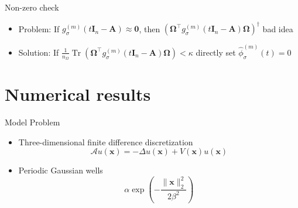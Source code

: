 \documentclass[aspectratio=169, leqno, 12pt]{beamer}
\newcommand{\mtx}[1]{\boldsymbol{#1}}
\newcommand{\vct}[1]{\boldsymbol{#1}}
\DeclareMathOperator{\Tr}{Tr}
\begin{document}
\begin{frame}{Non-zero check}
    \begin{itemize}
        \item Problem: If $g_{\sigma}^{(m)}(t\mtx{I}_n - \mtx{A}) \approx \mtx{0}$, then $(\mtx{\Omega}^{\top} g_{\sigma}^{(m)}(t\mtx{I}_n - \mtx{A}) \mtx{\Omega})^{\dagger}$ bad idea
        \item Solution: If $\frac{1}{n_{\Omega}} \Tr(\mtx{\Omega}^{\top} g_{\sigma}^{(m)}(t\mtx{I}_n - \mtx{A}) \mtx{\Omega}) < \kappa$ directly set $\widehat{\phi}_{\sigma}^{(m)}(t) = 0$
    \end{itemize}
    \centering
    \scalebox{0.8}{}
\end{frame}


\section{Numerical results}

\begin{frame}{Model Problem}
    \begin{itemize}
        \item Three-dimensional finite difference discretization \cite{lin2017randomized}
        \begin{equation}
            \mathcal{A} u(\vct{x}) = - \Delta u(\vct{x}) + V(\vct{x}) u(\vct{x})
        \end{equation}
        \item Periodic Gaussian wells
        \begin{equation}
            \alpha \exp(-\frac{\lVert \vct{x} \rVert _2^2}{ 2 \beta^2 })
        \end{equation}
    \end{itemize}
    \scalebox{0.85}{}
    \scalebox{0.85}{}
    \scalebox{0.85}{}
\end{frame}
\end{document}
